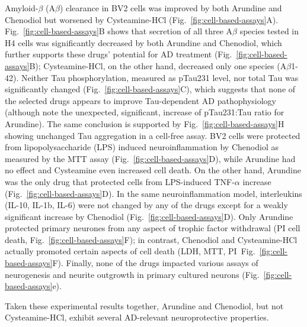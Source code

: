 \documentclass[letterpaper]{article}
\begin{document}
Amyloid-$\beta$
(A$\beta$) clearance in BV2 cells was improved by both Arundine and Chenodiol
but worsened by Cysteamine-HCl (Fig.~\ref{fig:cell-based-assays}A).
Fig.~\ref{fig:cell-based-assays}B shows that secretion of all three A$\beta$
species tested in H4 cells was significantly decreased by both Arundine and
Chenodiol, which further supports these drugs' potential for AD treatment
(Fig.~\ref{fig:cell-based-assays}B); Cysteamine-HCl, on the other hand,
decreased only one species (A$\beta$1-42).  Neither Tau phosphorylation,
measured as pTau231 level, nor total Tau was significantly changed
(Fig.~\ref{fig:cell-based-assays}C), which suggests that none of the selected
drugs appears to improve Tau-dependent AD pathophysiology (although note the
unexpected, significant, increase of pTau231:Tau ratio for Arundine).  The
same conclusion is supported by Fig.~\ref{fig:cell-based-assays}H showing
unchanged Tau aggregation in a cell-free assay. BV2 cells were protected from
lipopolysaccharide (LPS) induced neuroinflammation by Chenodiol as measured by
the MTT assay (Fig.~\ref{fig:cell-based-assays}D), while Arundine had no
effect and Cysteamine even increased cell death.  On the other hand, Arundine
was the only drug that protected cells from LPS-induced TNF-$\alpha$ increase
(Fig.~\ref{fig:cell-based-assays}D).  In the same neuroinflammation model,
interleukins (IL-10, IL-1b, IL-6) were not changed by any of the drugs except
for a weakly significant increase by Chenodiol
(Fig.~\ref{fig:cell-based-assays}D).  Only Arundine protected primary neurones
from any aspect of trophic factor withdrawal (PI cell death,
Fig.~\ref{fig:cell-based-assays}F); in contrast, Chenodiol and Cysteamine-HCl
actually promoted certain aspects of cell death (LDH, MTT,
PI~Fig.~\ref{fig:cell-based-assays}F).  Finally, none of the drugs impacted
various assays of neurogenesis and neurite outgrowth in primary cultured
neurons (Fig.~\ref{fig:cell-based-assays}e).

Taken these experimental results together, Arundine and Chenodiol, but not
Cysteamine-HCl, exhibit several AD-relevant neuroprotective properties.
\end{document}
